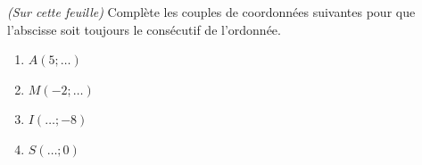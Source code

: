 %
%
    \emph{(Sur cette feuille)} Complète les couples de coordonnées suivantes pour que l'abscisse soit toujours le consécutif de l'ordonnée.
    \begin{enumerate}[cols=4, label=]
        \item $A\left(5; \ldots\right)$
        \item $M\left(-2; \ldots \right)$
        \item $I\left(\ldots ; -8\right)$
        \item $S\left(\ldots ; 0\right)$
    \end{enumerate}

